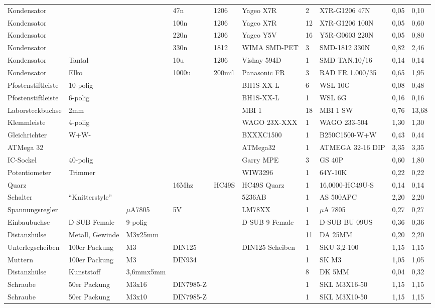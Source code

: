\documentclass[a4paper]{article}
\begin{document}
{\begin{tabular}{llllllllll}
Kondensator	& & &	47n & 1206 & Yageo X7R & 2	 & X7R-G1206 47N & 0,05 & 0,10 \\
Kondensator	& & &	100n & 1206 & Yageo X7R	& 12 & 	X7R-G1206 100N & 0,05 & 0,60 \\
Kondensator	& & &	220n & 1206 & Yageo Y5V	& 16 & 	Y5R-G0603 220N & 0,05 & 0,80 \\
Kondensator	& & &	330n & 1812 & WIMA SMD-PET & 3 & SMD-1812 330N & 0,82 & 2,46 \\
Kondensator & Tantal & & 10u & 1206 & Vishay 594D & 1 & SMD TAN.10/16 & 0,14 & 0,14 \\
Kondensator & Elko & & 1000u & 200mil & Panasonic FR & 3 & RAD FR 1.000/35 & 0,65 & 1,95 \\
Pfostenstiftleiste & 10-polig  & &  & & BH1S-XX-L & 6 & WSL 10G & 0,08 & 0,48 \\
Pfostenstiftleiste & 6-polig & &  & & BH1S-XX-L & 1 & WSL 6G & 0,16 & 0,16 \\
Laborsteckbuchse  & 2mm & & & & MBI 1 & 18 & MBI 1 SW & 0,76 & 13,68 \\
Klemmleiste & 4-polig & & & & WAGO 23X-XXX & 1 & WAGO 233-504 & 1,30 & 1,30 \\	
Gleichrichter & W+W- & & & & BXXXC1500 & 1 & B250C1500-W+W & 0,43 & 0,44 \\
ATMega 32 & & & & & ATMega32 & 1 & ATMEGA 32-16 DIP & 3,35 & 3,35 \\
IC-Sockel & 40-polig & & & & Garry MPE & 3 & GS 40P & 0,60 & 1,80 \\
Potentiometer & Trimmer & & & & WIW3296 & 1 & 64Y-10K & 0,22 & 0,22 \\
Quarz & & & 16Mhz & HC49S & HC49S Quarz & 1 & 16,0000-HC49U-S & 0,14 & 0,14 \\
Schalter & "`Knitterstyle"' & & & & 5236AB & 1 & AS 500APC & 2,20 & 2,20 \\
Spannungsregler & & $\mu$A7805 & 5V & & LM78XX & 1	& $\mu$A 7805 & 0,27 & 0,27 \\
Einbaubuchse & D-SUB Female & 9-polig & & & D-SUB 9 Female & 1 & D-SUB BU 09US & 0,36 & 0,36 \\
Distanzhülse & Metall, Gewinde & M3x25mm  & & & & 11 & DA 25MM & 0,20 & 2,20 \\
Unterlegscheiben & 100er Packung & M3 & DIN125 & & DIN125 Scheiben & 1 & SKU 3,2-100 & 1,15 & 1,15 \\
Muttern & 100er Packung & M3 & DIN934 & & & 1 & SK M3 & 1,05 & 1,05 \\
Distanzhülse & Kunststoff & 3,6mmx5mm & & & & 8 & DK 5MM & 0,04 & 0,32 \\
Schraube & 50er Packung & M3x16 & DIN7985-Z & & & 1 & SKL M3X16-50 & 1,15 & 1,15 \\
Schraube & 50er Packung & M3x10 & DIN7985-Z & & & 1 & SKL M3X10-50 & 1,15 & 1,15 \\
																												
																												
														

	\hline
\end{tabular}
}
\end{document}
